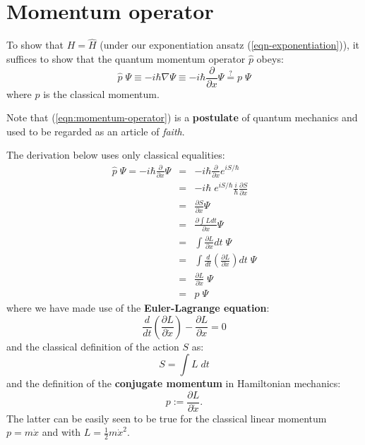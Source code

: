 \section{Momentum operator}
\label{sec:momentum-operator}

To show that $H = \hat{H}$ (under our exponentiation ansatz (\ref{eqn-exponentiation})), it suffices to show that the quantum momentum operator $\hat{p}$ obeys:
\begin{equation}
\hat{p} \; \Psi \equiv -i \hbar \nabla \Psi \equiv - i \hbar \frac{\partial}{\partial x} \Psi \stackrel{?}{=} p \; \Psi
\label{eqn:momentum-operator}
\end{equation}
where $p$ is the classical momentum.

Note that (\ref{eqn:momentum-operator}) is a \textbf{postulate} of quantum mechanics and used to be regarded as an article of \textit{faith}.

The derivation below uses only classical equalities:
\begin{eqnarray}
\hat{p} \; \Psi = -i \hbar \frac{\partial}{\partial x} \Psi
&=&  -i \hbar \frac{\partial}{\partial x} e^{i S / \hbar} \nonumber \\
&=& -i \hbar \; e^{i S / \hbar} \frac{i}{\hbar} \frac{\partial S}{\partial x} \nonumber \\
&=& \frac{\partial S}{\partial x} \Psi \nonumber \\
&=& \frac{\partial \int L dt}{\partial x} \Psi \nonumber \\
&=& \int \frac{\partial L}{\partial x} dt \; \Psi \nonumber \\
&=& \int \frac{d}{dt} \left( \frac{\partial L}{\partial \dot{x}} \right) dt \; \Psi \nonumber \\
&=& \frac{\partial L}{\partial \dot{x}} \; \Psi \nonumber \\
&=& p \; \Psi
\end{eqnarray}
where we have made use of the \textbf{Euler-Lagrange equation}:
\begin{equation}
\frac{d}{dt} \left( \frac{\partial L}{\partial \dot{x}} \right) - \frac{\partial L}{\partial x} = 0
\end{equation}
and the classical definition of the action $S$ as:
\begin{equation}
S = \int L \; dt
\end{equation}
and the definition of the \textbf{conjugate momentum} in Hamiltonian mechanics:
\begin{equation}
p := \frac{\partial L}{\partial \dot{x}} .
\end{equation}
The latter can be easily seen to be true for the classical linear momentum $p = m \dot{x}$ and with $L = \frac{1}{2} m \dot{x}^2$.

